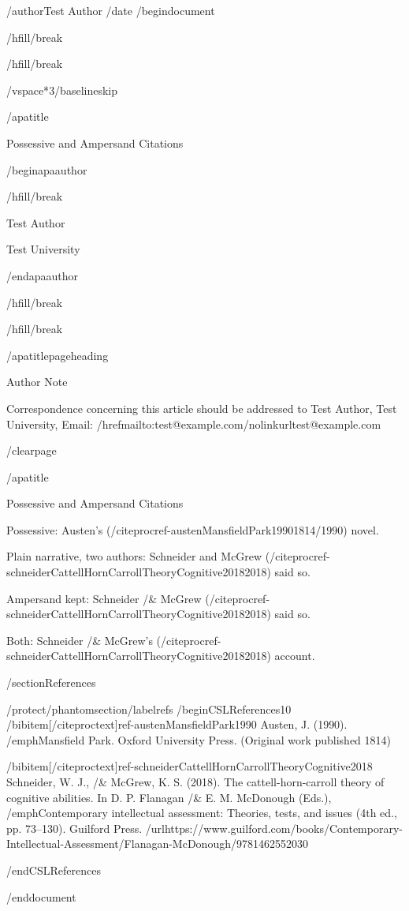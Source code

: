 /author{Test Author}
/date{}
/begin{document}


/hfill/break

/hfill/break

/vspace*{3/baselineskip}

/apatitle{

Possessive and Ampersand Citations

}

/begin{apaauthor}

/hfill/break

Test Author

Test University

/end{apaauthor}

/hfill/break

/hfill/break

/apatitlepageheading{

Author Note

}

Correspondence concerning this article should be addressed to Test
Author, Test University, Email:
/href{mailto:test@example.com}{/nolinkurl{test@example.com}}

/clearpage

/apatitle{

Possessive and Ampersand Citations

}

Possessive: Austen's (/citeproc{ref-austenMansfieldPark1990}{1814/1990})
novel.

Plain narrative, two authors: Schneider and McGrew
(/citeproc{ref-schneiderCattellHornCarrollTheoryCognitive2018}{2018})
said so.

Ampersand kept: Schneider /& McGrew
(/citeproc{ref-schneiderCattellHornCarrollTheoryCognitive2018}{2018})
said so.

Both: Schneider /& McGrew's
(/citeproc{ref-schneiderCattellHornCarrollTheoryCognitive2018}{2018})
account.

/section{References}

/protect/phantomsection/label{refs}
/begin{CSLReferences}{1}{0}
/bibitem[/citeproctext]{ref-austenMansfieldPark1990}
Austen, J. (1990). /emph{Mansfield {P}ark}. Oxford University Press.
(Original work published 1814)

/bibitem[/citeproctext]{ref-schneiderCattellHornCarrollTheoryCognitive2018}
Schneider, W. J., /& McGrew, K. S. (2018). The cattell-horn-carroll
theory of cognitive abilities. In D. P. Flanagan /& E. M. McDonough
(Eds.), /emph{Contemporary intellectual assessment: Theories, tests, and
issues} (4th ed., pp. 73--130). Guilford Press.
/url{https://www.guilford.com/books/Contemporary-Intellectual-Assessment/Flanagan-McDonough/9781462552030}

/end{CSLReferences}




/end{document}
